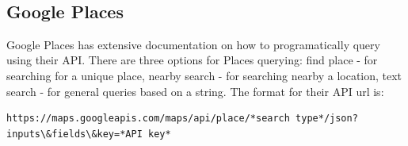 \documentclass[article,12pt]{article}
\numberwithin{equation}{section}
\begin{document}
\begin{adjustwidth}{-.7in}{-.7in}
	\\
\end{adjustwidth}

\subsection*{Google Places}

Google Places has extensive documentation on how to programatically query using their API. There are three options for Places querying: find place - for searching for a unique place, nearby search - for searching nearby a location, text search - for general queries based on a string. The format for their API url is: 

\begin{adjustwidth}{-.8in}{-.55in}
\small
\begin{verbatim}
https://maps.googleapis.com/maps/api/place/*search type*/json?inputs\&fields\&key=*API key*
\end{verbatim}
\end{adjustwidth}
\end{document}
